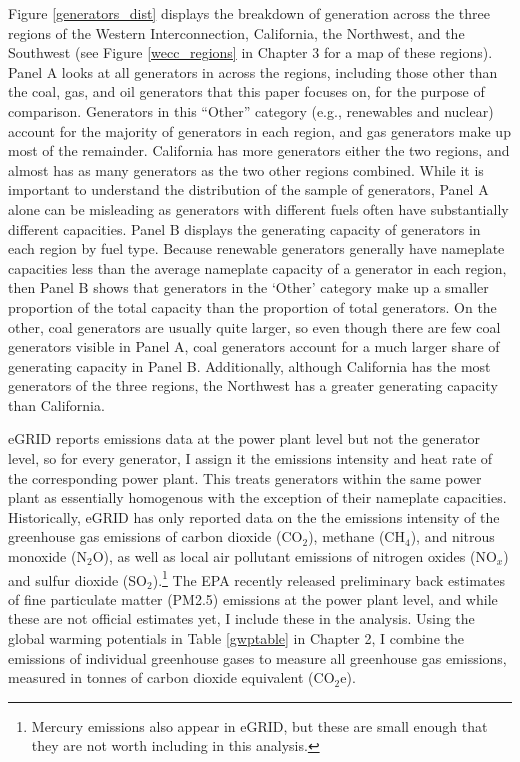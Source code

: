Figure \ref{generators_dist} displays the breakdown of generation across the three regions of the Western Interconnection, California, the Northwest, and the Southwest (see Figure \ref{wecc_regions} in Chapter 3 for a map of these regions). Panel A looks at all generators in across the regions, including those other than the coal, gas, and oil generators that this paper focuses on, for the purpose of comparison. Generators in this ``Other'' category (e.g., renewables and nuclear) account for the majority of generators in each region, and gas generators make up most of the remainder. California has more generators either the two regions, and almost has as many generators as the two other regions combined. While it is important to understand the distribution of the sample of generators, Panel A alone can be misleading as generators with different fuels often have substantially different capacities. Panel B displays the generating capacity of generators in each region by fuel type. Because renewable generators generally have nameplate capacities less than the average nameplate capacity of a generator in each region, then Panel B shows that generators in the `Other' category make up a smaller proportion of the total capacity than the proportion of total generators. On the other, coal generators are usually quite larger, so even though there are few coal generators visible in Panel A, coal generators account for a much larger share of generating capacity in Panel B. Additionally, although California has the most generators of the three regions, the Northwest has a greater generating capacity than California. 

eGRID reports emissions data at the power plant level but not the generator level, so for every generator, I assign it the emissions intensity and heat rate of the corresponding power plant. This treats generators within the same power plant as essentially homogenous with the exception of their nameplate capacities. Historically, eGRID has only reported data on the the emissions intensity of the greenhouse gas emissions of carbon dioxide (CO$_2$), methane (CH$_4$), and nitrous monoxide (N$_2$O), as well as local air pollutant emissions of nitrogen oxides (NO$_x$) and sulfur dioxide (SO$_2$).\footnote{Mercury emissions also appear in eGRID, but these are small enough that they are not worth including in this analysis.} The EPA recently released preliminary back estimates of fine particulate matter (PM2.5) emissions at the power plant level, and while these are not official estimates yet, I include these in the analysis. Using the global warming potentials in Table \ref{gwptable} in Chapter 2, I combine the emissions of individual greenhouse gases to measure all greenhouse gas emissions, measured in tonnes of carbon dioxide equivalent (CO$_2$e). 

